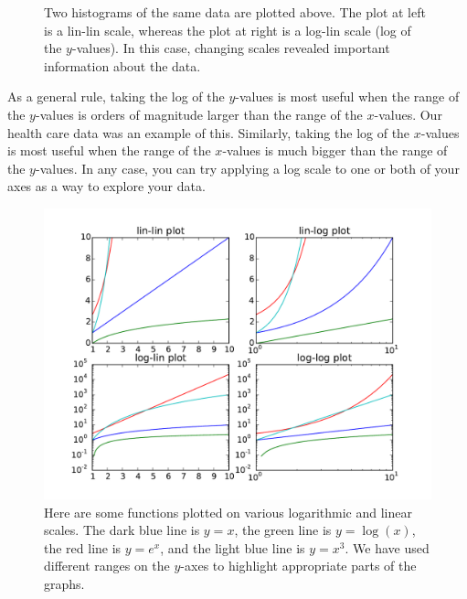 \begin{figure}
\begin{subfigure}{.5\textwidth}
\end{subfigure}
\caption{Two histograms of the same data are plotted above. 
The plot at left is a lin-lin scale, whereas the plot at right is a log-lin scale (log of the $y$-values). 
In this case, changing scales revealed important information about the data.}
\label{fig:healthcare}
\end{figure}

As a general rule, taking the log of the $y$-values is most useful when the range of the $y$-values is orders of magnitude larger than the range of the $x$-values. 
Our health care data was an example of this. 
Similarly, taking the log of the $x$-values is most useful when the range of the $x$-values is much bigger than the range of the $y$-values. 
In any case, you can try applying a log scale to one or both of your axes as a way to explore your data.

\begin{figure}
\centering
\includegraphics[width=\textwidth]{log_plots.pdf}
\caption{Here are some functions plotted on various logarithmic and linear scales. 
The dark blue line is $y=x$, the green line is $y=\log(x)$, the red line is $y=e^x$, and the light blue line is $y=x^3$. 
We have used different ranges on the $y$-axes to highlight appropriate parts of the graphs.}
\label{fig:log_plots}
\end{figure}

